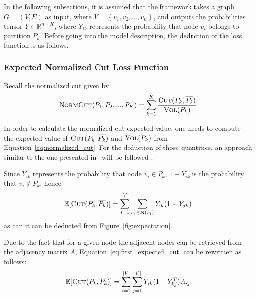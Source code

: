 In the following subsections, it is assumed that the framework takes a graph $G = (V, E)$ as input, where $V = \left\{ v_1, v_2, ..., v_n\right\}$, and outputs the probabilities tensor $Y\in \mathbb R^{n\times K}$, where $Y_{ik}$ represents the probability that node $v_i$ belongs to partition $P_k$. %
Before going into the model description, the deduction of the loss function is as follows.

\subsubsection{Expected Normalized Cut Loss Function}
Recall the normalized cut given by
\begin{equation}
    \label{eq:normalized_cut}
        \textsc{NormCut}(P_1, P_2, ..., P_K) = \sum_{k=1}^K \frac{\textsc{Cut}(P_k, \overline{P_k})}{\textsc{Vol}(P_k)}
\end{equation}
    
In order to calculate the normalized cut expected value, one needs to compute the expected value of $\textsc{Cut}(P_k, \overline{P_k})$ and $\textsc{Vol}(P_k)$ from Equation~\ref{eq:normalized_cut}. For the deduction of those quantities, an approach similar to the one presented in~\citep{gap2} will be followed .

Since $Y_{ik}$ represents the probability that node $v_i\in P_k$, $1 - Y_{ik}$ is the probability that $v_i\notin P_k$, hence 
\begin{equation}
    \label{eq:first_expected_cut}
    \mathbb{E}[\textsc{Cut}(P_k, \overline{P_k})] = \sum_{i=1}^{|V|} \sum_{v_j\in\EuScript{N}(v_i)} Y_{ik}(1-Y_{jk})
\end{equation}
as can it can be deducted from Figure~\ref{fig:expectation}.

Due to the fact that for a given node the adjacent nodes can be retrieved from the adjacency matrix $A$, Equation~\ref{eq:first_expected_cut} can be rewritten as follows:
\begin{equation}
    \label{eq:expected_cut}
    \mathbb{E}[\textsc{Cut}(P_k, \overline{P_k})] = \sum_{i=1}^{|V|}\sum_{j=1}^{|V|}Y_{ik}(1-Y_{kj}^T)A_{ij} 
\end{equation}

